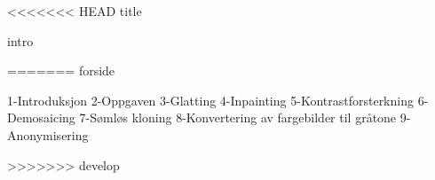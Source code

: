 \documentclass{article}
\begin{document}
<<<<<<< HEAD
{title}


\tableofcontents

\listoffigures

\listoftables

\mainmatter
{intro}

\newpage

=======
{forside}

\tableofcontents
\listoffigures
\listoftables

\mainmatter
{1-Introduksjon}
{2-Oppgaven}
{3-Glatting}
{4-Inpainting}
{5-Kontrastforsterkning}
{6-Demosaicing}
{7-Sømløs kloning}
{8-Konvertering av fargebilder til gråtone}
{9-Anonymisering}

\newpage

>>>>>>> develop
\end{document}
